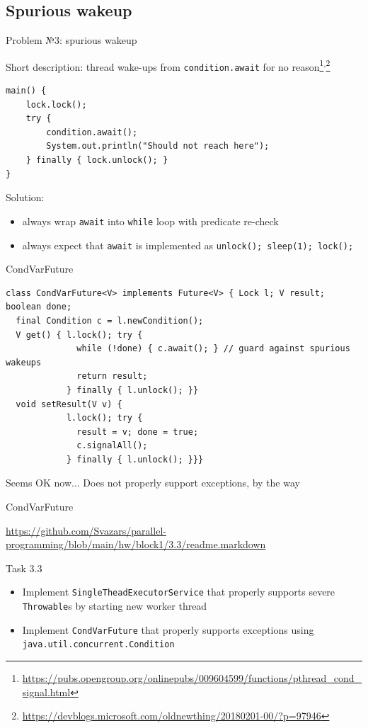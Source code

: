 \subsection{Spurious wakeup}
\showTOCSub

\begin{frame}[fragile]{Problem №3: spurious wakeup}

Short description: thread wake-ups from \texttt{condition.await} for no reason\footnote{\url{https://pubs.opengroup.org/onlinepubs/009604599/functions/pthread_cond_signal.html}}\textsuperscript{,}\footnote{\url{https://devblogs.microsoft.com/oldnewthing/20180201-00/?p=97946}}

\begin{verbatim}
main() {
    lock.lock();
    try {
        condition.await();
        System.out.println("Should not reach here");
    } finally { lock.unlock(); }    
}
\end{verbatim}

\pause

Solution:
\begin{itemize} 
    \item always wrap \texttt{await} into \texttt{while} loop with predicate re-check
    \item always expect that \texttt{await} is implemented as \texttt{unlock(); sleep(1); lock();}
\end{itemize}
\end{frame}

\begin{frame}[t,fragile]{CondVarFuture}

\begin{verbatim}
class CondVarFuture<V> implements Future<V> { Lock l; V result; boolean done;
  final Condition c = l.newCondition();
  V get() { l.lock(); try {
              while (!done) { c.await(); } // guard against spurious wakeups
              return result; 
            } finally { l.unlock(); }}
  void setResult(V v) { 
            l.lock(); try { 
              result = v; done = true;
              c.signalAll();
            } finally { l.unlock(); }}}
\end{verbatim}

\pause Seems OK now... \pause Does not properly support exceptions, by the way
\end{frame}

\begin{frame}[fragile]{CondVarFuture}

{\tiny\url{https://github.com/Svazars/parallel-programming/blob/main/hw/block1/3.3/readme.markdown}}
\begin{homeworkmail}{Task 3.3}
    \begin{itemize}
        \item Implement \texttt{SingleTheadExecutorService} that properly supports severe \texttt{Throwable}s by starting new worker thread
        \item Implement \texttt{CondVarFuture} that properly supports exceptions using \texttt{java.util.concurrent.Condition}
    \end{itemize}
\end{homeworkmail}
\end{frame}

